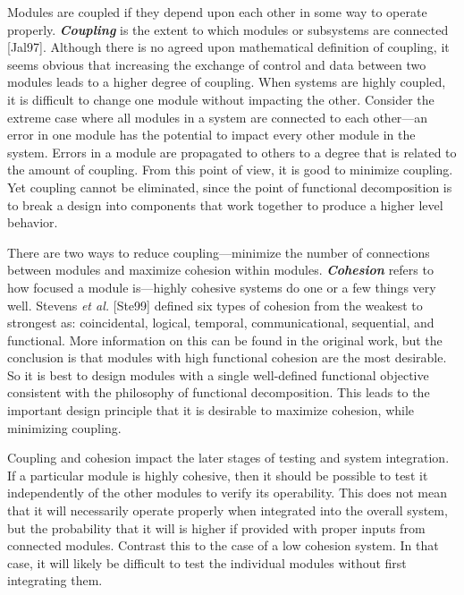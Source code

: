 Modules are coupled if they depend upon each other in some way to
operate properly. \emph{\textbf{Coupling}} is the extent to which
modules or subsystems are connected {[}Jal97{]}. Although there is no
agreed upon mathematical definition of coupling, it seems obvious that
increasing the exchange of control and data between two modules leads to
a higher degree of coupling. When systems are highly coupled, it is
difficult to change one module without impacting the other. Consider the
extreme case where all modules in a system are connected to each
other---an error in one module has the potential to impact every other
module in the system. Errors in a module are propagated to others to a
degree that is related to the amount of coupling. From this point of
view, it is good to minimize coupling. Yet coupling cannot be
eliminated, since the point of functional decomposition is to break a
design into components that work together to produce a higher level
behavior.

There are two ways to reduce coupling---minimize the number of
connections between modules and maximize cohesion within modules.
\emph{\textbf{Cohesion}} refers to how focused a module is---highly
cohesive systems do one or a few things very well. Stevens \emph{et al.}
{[}Ste99{]} defined six types of cohesion from the weakest to strongest
as: coincidental, logical, temporal, communicational, sequential, and
functional. More information on this can be found in the original work,
but the conclusion is that modules with high functional cohesion are the
most desirable. So it is best to design modules with a single
well-defined functional objective consistent with the philosophy of
functional decomposition. This leads to the important design principle
that it is desirable to maximize cohesion, while minimizing coupling.

Coupling and cohesion impact the later stages of testing and system
integration. If a particular module is highly cohesive, then it should
be possible to test it independently of the other modules to verify its
operability. This does not mean that it will necessarily operate
properly when integrated into the overall system, but the probability
that it will is higher if provided with proper inputs from connected
modules. Contrast this to the case of a low cohesion system. In that
case, it will likely be difficult to test the individual modules without
first integrating them.

